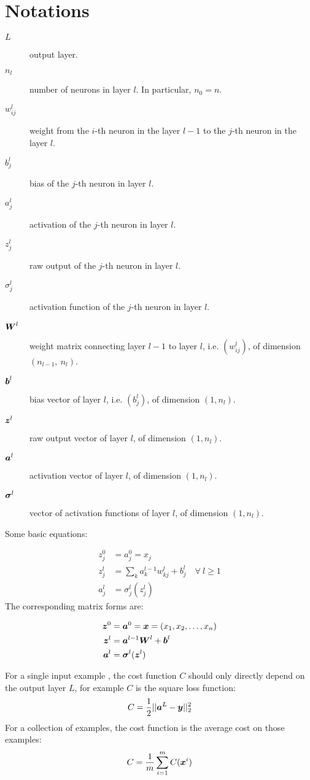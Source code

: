 \section{Notations}
\begin{description}
    \item[$L$] output layer.
    \item[$n_l$] number of neurons in layer $l$. In particular, $n_0 = n$.
    \item[$w^l_{ij}$] weight from the $i$-th neuron in the layer $l-1$ to the $j$-th neuron in the layer $l$.
    \item[$b^l_j$] bias of the $j$-th neuron in layer $l$.
    \item[$a^l_j$] activation of the $j$-th neuron in layer $l$.
    \item[$z^l_j$] raw output of the $j$-th neuron in layer $l$.
    \item[$\sigma^l_j$] activation function of the $j$-th neuron in layer $l$.
    \item[$\boldsymbol{W}^l$] weight matrix connecting layer $l-1$ to layer $l$, i.e. $(w^l_{ij})$, of dimension 
    $(n_{l-1},\ n_l)$.
    \item[$\boldsymbol{b}^l$] bias vector of layer $l$, i.e. $(b^l_j)$, of dimension $(1, n_l)$.
    \item[$\boldsymbol{z}^l$] raw output vector of layer $l$, of dimension $(1, n_l)$.
    \item[$\boldsymbol{a}^l$] activation vector of layer $l$, of dimension $(1, n_l)$.
    \item[$\boldsymbol{\sigma}^l$] vector of activation functions of layer $l$, of dimension $(1, n_l)$.
\end{description}

Some basic equations:

\begin{align}
    z^0_j &= a^0_j = x_j\\
    z^l_j &= \sum_k a^{l-1}_{k} w^l_{kj} + b^l_j\quad\forall~l\geq 1\\
    a^l_j &= \sigma^l_j(z^l_j)
\end{align}
The corresponding matrix forms are:

\begin{align}
    \boldsymbol{z}^0 &= \boldsymbol{a}^0 = \boldsymbol{x} = (x_1, x_2, \ldots, x_{n})\\
    \boldsymbol{z}^l &= \boldsymbol{a}^{l-1} \boldsymbol{W}^l + \boldsymbol{b}^l\\
    \boldsymbol{a}^l &= \boldsymbol{\sigma}^l(\boldsymbol{z}^l)
\end{align}

For a single input example , the cost function $C$ should only directly depend on the output layer $L$,
for example $C$ is the square loss function:
\begin{equation}\label{nn_square_loss}
    C = \frac{1}{2} ||\boldsymbol{a}^L - \boldsymbol{y}||^2_2
\end{equation}
For a collection of examples, the cost function is the average cost on those examples:
\begin{equation}
    C = \frac{1}{m} \sum_{i=1}^m C(\boldsymbol{x}^i)
\end{equation}

